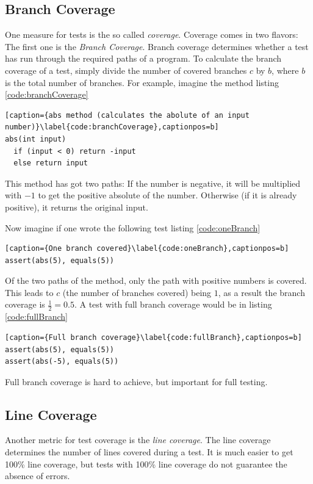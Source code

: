\subsection{Branch Coverage}

One measure for tests is the so called \textit{coverage}. Coverage
comes in two flavors: The first one is the \textit{Branch Coverage}.
Branch coverage determines whether a test has run through the
required paths of a program. To calculate the branch coverage of a test,
simply divide the number of covered branches $c$ by $b$, where $b$ is the
total number of branches. For example, imagine the method listing \ref{code:branchCoverage}

\begin{lstlisting}[caption={abs method (calculates the abolute of an input number)}\label{code:branchCoverage},captionpos=b]
abs(int input)
  if (input < 0) return -input
  else return input
\end{lstlisting}

This method has got two paths: If the number is negative, it will
be multiplied with $-1$ to get the positive absolute of the number.
Otherwise (if it is already positive), it returns the original input.

Now imagine if one wrote the following test listing \ref{code:oneBranch}

\begin{lstlisting}[caption={One branch covered}\label{code:oneBranch},captionpos=b]
assert(abs(5), equals(5))
\end{lstlisting}

Of the two paths of the method, only the path with positive numbers is
covered. This leads to $c$ (the number of branches covered) being $1$,
as a result the branch coverage is $\frac{1}{2} = 0.5$. A test with
full branch coverage would be in listing \ref{code:fullBranch}

\begin{lstlisting}[caption={Full branch coverage}\label{code:fullBranch},captionpos=b]
assert(abs(5), equals(5))
assert(abs(-5), equals(5))
\end{lstlisting}

Full branch coverage is hard to achieve, but important for full testing.

\subsection{Line Coverage}

Another metric for test coverage is the \textit{line coverage}. The line
coverage determines the number of lines covered during a test. It is much
easier to get 100\% line coverage, but tests with 100\% line coverage do
not guarantee the absence of errors.

